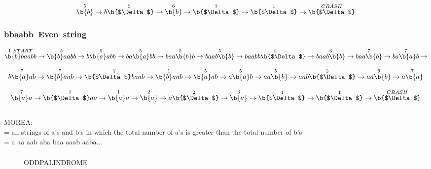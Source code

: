 \documentclass[12pt]{article}
\begin{document}
\[
\overset{5}{\b{b}}\rightarrow
\overset{5}{b\b{$\Delta$}}\rightarrow
\overset{6}{\b{b}}\rightarrow
\overset{7}{\b{$\Delta$}}\rightarrow
\overset{1}{\b{$\Delta$}}\rightarrow
\overset{CRASH}{\b{$\Delta$}}
\]

\subsubsection{bbaabb~Even~string}

\[
\overset{1~START}{\b{b}baabb}\rightarrow
\overset{5}{\b{b}aabb}\rightarrow
\overset{5}{b\b{a}abb}\rightarrow
\overset{5}{ba\b{a}bb}\rightarrow
\overset{5}{baa\b{b}b}\rightarrow
\overset{5}{baab\b{b}}\rightarrow
\overset{5}{baabb\b{$\Delta$}}\rightarrow
\overset{6}{baab\b{b}}\rightarrow
\overset{7}{baa\b{b}}\rightarrow
\overset{7}{ba\b{a}b}\rightarrow
\]

\[
\overset{7}{b\b{a}ab}\rightarrow
\overset{7}{\b{b}aab}\rightarrow
\overset{7}{\b{$\Delta$}baab}\rightarrow
\overset{1}{\b{b}aab}\rightarrow
\overset{5}{\b{a}ab}\rightarrow
\overset{5}{a\b{a}b}\rightarrow
\overset{5}{aa\b{b}}\rightarrow
\overset{5}{aab\b{$\Delta$}}\rightarrow
\overset{6}{aa\b{b}}\rightarrow
\overset{7}{a\b{a}}
\]

\[
\overset{7}{\b{a}a}\rightarrow
\overset{7}{\b{$\Delta$}aa}\rightarrow
\overset{1}{\b{a}a}\rightarrow
\overset{2}{\b{a}}\rightarrow
\overset{2}{a\b{$\Delta$}}\rightarrow
\overset{3}{\b{a}}\rightarrow
\overset{4}{\b{$\Delta$}}\rightarrow
\overset{1}{\b{$\Delta$}}\rightarrow
\overset{CRASH}{\b{$\Delta$}}
\]
\clearpage

\subsection{}
MOREA:\\
= {all strings of a's  and b's  in which the total number of a's is greater than the total number of b's}\\  
= {a aa aab aba baa aaab aaba...}
\subsubsection{}
\begin{figure}
\begin{center}
\caption{ODDPALINDROME}
\end{center}
\end{figure}
\end{document}

